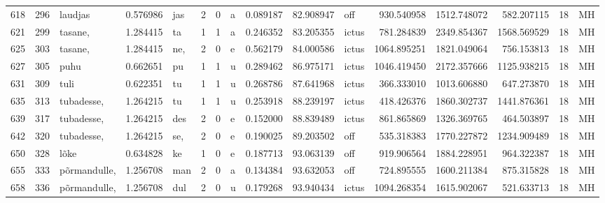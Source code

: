 \begin{tabular}{lrlrllllrrlrrrll}
618  &         296 &          laudjas &  0.576986 &     jas &        2 &      0 &       a &      0.089187 &     82.908947 &    off &   930.540958 &  1512.748072 &   582.207115 &     18 &        MH \\
621  &         299 &          tasane, &  1.284415 &      ta &        1 &      1 &       a &      0.246352 &     83.205355 &  ictus &   781.284839 &  2349.854367 &  1568.569529 &     18 &        MH \\
625  &         303 &          tasane, &  1.284415 &     ne, &        2 &      0 &       e &      0.562179 &     84.000586 &  ictus &  1064.895251 &  1821.049064 &   756.153813 &     18 &        MH \\
627  &         305 &             puhu &  0.662651 &      pu &        1 &      1 &       u &      0.289462 &     86.975171 &  ictus &  1046.419450 &  2172.357666 &  1125.938215 &     18 &        MH \\
631  &         309 &             tuli &  0.622351 &      tu &        1 &      1 &       u &      0.268786 &     87.641968 &  ictus &   366.333010 &  1013.606880 &   647.273870 &     18 &        MH \\
635  &         313 &       tubadesse, &  1.264215 &      tu &        1 &      1 &       u &      0.253918 &     88.239197 &  ictus &   418.426376 &  1860.302737 &  1441.876361 &     18 &        MH \\
639  &         317 &       tubadesse, &  1.264215 &     des &        2 &      0 &       e &      0.152000 &     88.839489 &  ictus &   861.865869 &  1326.369765 &   464.503897 &     18 &        MH \\
642  &         320 &       tubadesse, &  1.264215 &     se, &        2 &      0 &       e &      0.190025 &     89.203502 &    off &   535.318383 &  1770.227872 &  1234.909489 &     18 &        MH \\
650  &         328 &             lõke &  0.634828 &      ke &        1 &      0 &       e &      0.187713 &     93.063139 &    off &   919.906564 &  1884.228951 &   964.322387 &     18 &        MH \\
655  &         333 &     põrmandulle, &  1.256708 &     man &        2 &      0 &       a &      0.134384 &     93.632053 &    off &   724.895555 &  1600.211384 &   875.315828 &     18 &        MH \\
658  &         336 &     põrmandulle, &  1.256708 &     dul &        2 &      0 &       u &      0.179268 &     93.940434 &  ictus &  1094.268354 &  1615.902067 &   521.633713 &     18 &        MH \\

\end{tabular}
